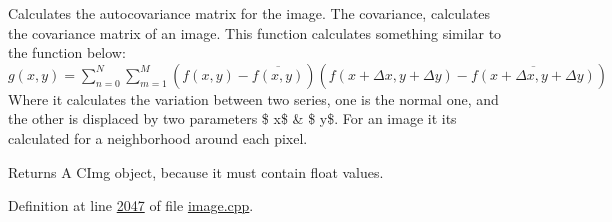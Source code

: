 Calculates the autocovariance matrix for the image. The covariance, calculates the covariance matrix of an image. This function calculates something similar to the function below\-: $ g(x,y) = \sum \limits_{n=0}^{N} \sum \limits_{m=1}^M \left( f(x,y) - \overline{f(x,y)}\right)\left(f(x + \Delta x, y + \Delta y) - \overline{f(x + \Delta x, y + \Delta y)} \right) $ Where it calculates the variation between two series, one is the normal one, and the other is displaced by two parameters \$ x\$ \& \$ y\$. For an image it its calculated for a neighborhood around each pixel. 

\begin{DoxyReturn}{Returns}
A C\-Img object, because it must contain float values. 
\end{DoxyReturn}


Definition at line \hyperlink{image_8cpp_source_l02047}{2047} of file \hyperlink{image_8cpp_source}{image.\-cpp}.


